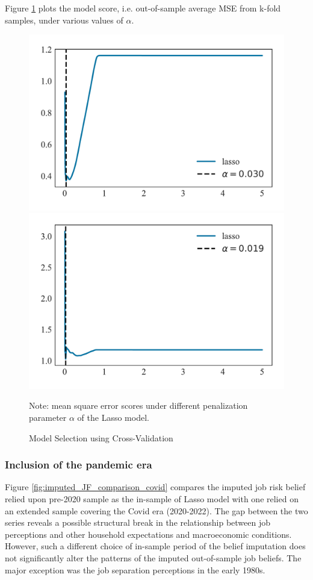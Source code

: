  Figure \ref{fig:impute_cv} plots the model score, i.e. out-of-sample average MSE from k-fold samples, under various values of $\alpha$. 

      \begin{figure}[ht]
    	\caption{Model Selection using Cross-Validation}
    	\label{fig:impute_cv}
    	\begin{center}
	\includegraphics[width=0.48\linewidth]{Figures/unbounded_imputing_job_finding_cv.pdf} 
\includegraphics[width=0.48\linewidth]{Figures/unbounded_imputing_job_separation_cv.pdf} 
    	\end{center}
    
    	\begin{flushleft}Note: mean square error scores under different penalization parameter $\alpha$ of the Lasso model.\end{flushleft}
    \end{figure}
    
\subsubsection{Inclusion of the pandemic era}
\label{appendix:sensitivity_imputation}

Figure \ref{fig:imputed_JF_comparison_covid} compares the imputed job risk belief relied upon pre-2020 sample as the in-sample of Lasso model with one relied on an extended sample covering the Covid era (2020-2022). The gap between the two series reveals a possible structural break in the relationship between job perceptions and other household expectations and macroeconomic conditions. However, such a different choice of in-sample period of the belief imputation does not significantly alter the patterns of the imputed out-of-sample job beliefs. The major exception was the job separation perceptions in the early 1980s.  

